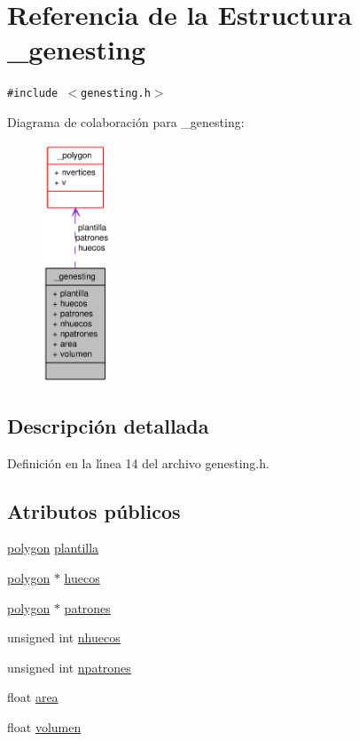 \hypertarget{struct__genesting}{
\section{Referencia de la Estructura \_\-genesting}
\label{struct__genesting}
}
{\tt \#include $<$genesting.h$>$}

Diagrama de colaboraci\'{o}n para \_\-genesting:\begin{figure}[H]
\begin{center}
\leavevmode
\includegraphics[width=59pt]{struct__genesting__coll__graph}
\end{center}
\end{figure}


\subsection{Descripci\'{o}n detallada}




Definici\'{o}n en la l\'{\i}nea 14 del archivo genesting.h.\subsection*{Atributos p\'{u}blicos}
\begin{CompactItemize}
\item 
\hyperlink{struct__polygon}{polygon} \hyperlink{struct__genesting_c660e2710da2db9469813d0a14981cef_c660e2710da2db9469813d0a14981cef}{plantilla}
\item 
\hyperlink{struct__polygon}{polygon} $\ast$ \hyperlink{struct__genesting_3affb28e2ad244f35baed248e3c230f6_3affb28e2ad244f35baed248e3c230f6}{huecos}
\item 
\hyperlink{struct__polygon}{polygon} $\ast$ \hyperlink{struct__genesting_c4b1743e42547577dbb6d7238ad4db17_c4b1743e42547577dbb6d7238ad4db17}{patrones}
\item 
unsigned int \hyperlink{struct__genesting_87ae802e5ffa06a1b38ce4337eadbcda_87ae802e5ffa06a1b38ce4337eadbcda}{nhuecos}
\item 
unsigned int \hyperlink{struct__genesting_a5ebd60476ce0253be4e5a09349433e1_a5ebd60476ce0253be4e5a09349433e1}{npatrones}
\item 
float \hyperlink{struct__genesting_052920321c80561169cd61a8eb301378_052920321c80561169cd61a8eb301378}{area}
\item 
float \hyperlink{struct__genesting_313b6909792763a5381ce7ff14830d6d_313b6909792763a5381ce7ff14830d6d}{volumen}
\end{CompactItemize}


